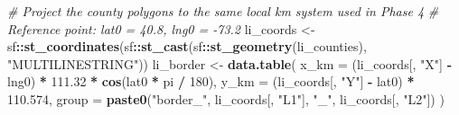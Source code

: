 \documentclass[
]{article}
\newenvironment{Shaded}{\begin{snugshade}}{\end{snugshade}}
\newcommand{\AttributeTok}[1]{\textcolor[rgb]{0.13,0.29,0.53}{#1}}
\newcommand{\CommentTok}[1]{\textcolor[rgb]{0.56,0.35,0.01}{\textit{#1}}}
\newcommand{\DecValTok}[1]{\textcolor[rgb]{0.00,0.00,0.81}{#1}}
\newcommand{\FloatTok}[1]{\textcolor[rgb]{0.00,0.00,0.81}{#1}}
\newcommand{\FunctionTok}[1]{\textcolor[rgb]{0.13,0.29,0.53}{\textbf{#1}}}
\newcommand{\NormalTok}[1]{#1}
\newcommand{\OtherTok}[1]{\textcolor[rgb]{0.56,0.35,0.01}{#1}}
\newcommand{\SpecialCharTok}[1]{\textcolor[rgb]{0.81,0.36,0.00}{\textbf{#1}}}
\newcommand{\StringTok}[1]{\textcolor[rgb]{0.31,0.60,0.02}{#1}}
\begin{document}
\begin{Shaded}
\begin{Highlighting}[]
\CommentTok{\# Project the county polygons to the same local km system used in Phase 4}
\CommentTok{\# Reference point: lat0 = 40.8, lng0 = {-}73.2}
\NormalTok{li\_coords }\OtherTok{\textless{}{-}}\NormalTok{ sf}\SpecialCharTok{::}\FunctionTok{st\_coordinates}\NormalTok{(sf}\SpecialCharTok{::}\FunctionTok{st\_cast}\NormalTok{(sf}\SpecialCharTok{::}\FunctionTok{st\_geometry}\NormalTok{(li\_counties), }\StringTok{"MULTILINESTRING"}\NormalTok{))}
\NormalTok{li\_border }\OtherTok{\textless{}{-}} \FunctionTok{data.table}\NormalTok{(}
  \AttributeTok{x\_km =}\NormalTok{ (li\_coords[, }\StringTok{"X"}\NormalTok{] }\SpecialCharTok{{-}}\NormalTok{ lng0) }\SpecialCharTok{*} \FloatTok{111.32} \SpecialCharTok{*} \FunctionTok{cos}\NormalTok{(lat0 }\SpecialCharTok{*}\NormalTok{ pi }\SpecialCharTok{/} \DecValTok{180}\NormalTok{),}
  \AttributeTok{y\_km =}\NormalTok{ (li\_coords[, }\StringTok{"Y"}\NormalTok{] }\SpecialCharTok{{-}}\NormalTok{ lat0) }\SpecialCharTok{*} \FloatTok{110.574}\NormalTok{,}
  \AttributeTok{group =} \FunctionTok{paste0}\NormalTok{(}\StringTok{"border\_"}\NormalTok{, li\_coords[, }\StringTok{"L1"}\NormalTok{], }\StringTok{"\_"}\NormalTok{, li\_coords[, }\StringTok{"L2"}\NormalTok{])}
\NormalTok{)}


\end{Highlighting}
\end{Shaded}
\end{document}
